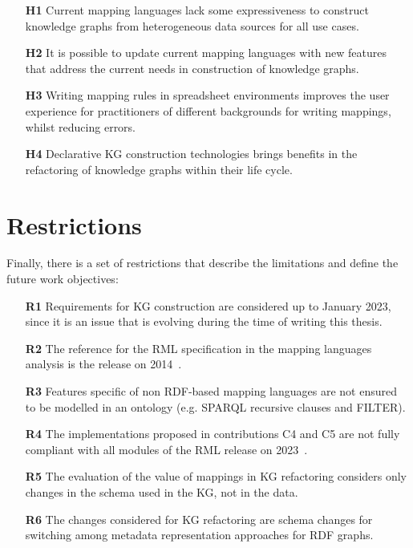 \begin{enumerate}
    \item[\textbf{H1}] Current mapping languages lack some expressiveness to construct knowledge graphs from heterogeneous data sources for all use cases.
    \item[\textbf{H2}] It is possible to update  current mapping languages with new features that address the current needs in construction of knowledge graphs.
    \item[\textbf{H3}] Writing mapping rules in spreadsheet environments improves the user experience for practitioners of different backgrounds for writing mappings, whilst reducing errors. 
    \item[\textbf{H4}] Declarative KG construction technologies brings benefits in the refactoring of knowledge graphs within their life cycle.
\end{enumerate}


\section{Restrictions}
\label{sec:chp3-restrictions}

Finally, there is a set of restrictions that describe the limitations and define the future work objectives:

\begin{enumerate}
    \item[\textbf{R1}] Requirements for KG construction are considered up to January 2023, since it is an issue that is evolving during the time of writing this thesis.
    \item[\textbf{R2}] The reference for the RML specification in the mapping languages analysis is the release on 2014~\parencite{Dimou2014rml}.
    \item[\textbf{R3}] Features specific of non RDF-based mapping languages are not ensured to be modelled in an ontology (e.g. SPARQL recursive clauses and FILTER).
    \item[\textbf{R4}] The implementations proposed in contributions C4 and C5 are not fully compliant with all modules of the RML release on 2023~\parencite{iglesias2023rml}. 
    \item[\textbf{R5}] The evaluation of the value of mappings in KG refactoring considers only changes in the schema used in the KG, not in the data.
    \item[\textbf{R6}] The changes considered for KG refactoring are schema changes for switching among metadata representation approaches for RDF graphs.
\end{enumerate}


